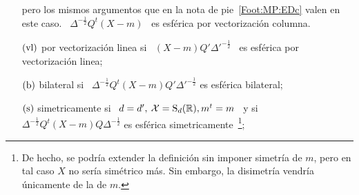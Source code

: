 \begin{definicion}
\begin{itemize}
{      pero los mismos  argumentos que en la nota  de pie~\ref{Foot:MP:EDc} valen
      en este caso.  \label{Foot:MP:EDvc}}  \ $\Delta^{-\frac12} Q^t (X-m)$ \ es
    esf\'erica por vectorizaci\'on columna.
  \item[$(\mathrm{vl})$] por vectorizaci\'on linea  si \ $(X-m) Q' \Delta'^{-\frac12}$
    \ es esf\'erica por vectorizaci\'on linea;
  \item[$(\mathrm{b})$]   bilateral    si   \   $\Delta^{-\frac12}    Q^t   (X-m)   Q'
    \Delta'^{-\frac12}$ es esf\'erica bilateral;
  \item[$(\mathrm{s})$] simetricamente si \ $d = d', \: \mathcal{X} = \mathrm{S}_d(\mathbb{R}), m^t = m$
    \ y si  \ \ $\Delta^{-\frac12} Q^t (X-m)  Q \Delta^{-\frac12}$ es esf\'erica
    simetricamente~\footnote{De hecho, se  podr\'ia extender la definici\'on sin
      imponer simetr\'ia  de $m$,  pero en tal  caso $X$ no  ser\'ia sim\'etrico
      m\'as. Sin embargo, la disimetr\'ia vendr\'ia \'unicamente de la de $m$.};
  \end{itemize}
\end{definicion}


